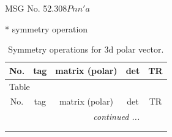 \documentclass[fleqn,8pt]{jsarticle}
\begin{document}
\setcounter{MaxMatrixCols}{32}

\renewcommand{\tablename}{Table~}
\renewcommand{\figurename}{Figure~}
\begin{center}
\LARGE
MSG No. 52.308\quad$Pnn'a$
\end{center}
* symmetry operation
\renewcommand{\arraystretch}{1.3}
\begin{longtable}{ccccc}
\caption{Symmetry operations for 3d polar vector.}
 \\
 \hline \hline
No. & tag & matrix (polar) & det & TR \\ \hline \endfirsthead

\multicolumn{4}{l}{\tablename\ \thetable{}} \\
 \hline \hline
No. & tag & matrix (polar) & det & TR \\ \hline \endhead

 \hline \hline
\multicolumn{4}{r}{\footnotesize\it continued ...} \\ \endfoot

 \hline \hline
\multicolumn{4}{r}{} \\ \endlastfoot


\end{longtable}
\end{document}
